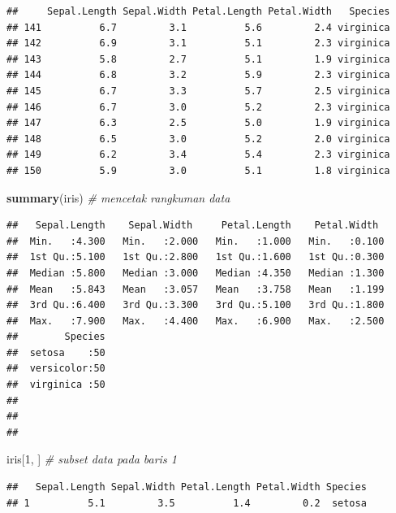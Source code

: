 \documentclass[]{article}
\newenvironment{Shaded}{\begin{snugshade}}{\end{snugshade}}
\newcommand{\KeywordTok}[1]{\textcolor[rgb]{0.13,0.29,0.53}{\textbf{#1}}}
\newcommand{\DecValTok}[1]{\textcolor[rgb]{0.00,0.00,0.81}{#1}}
\newcommand{\CommentTok}[1]{\textcolor[rgb]{0.56,0.35,0.01}{\textit{#1}}}
\newcommand{\NormalTok}[1]{#1}
\begin{document}
\begin{verbatim}
##     Sepal.Length Sepal.Width Petal.Length Petal.Width   Species
## 141          6.7         3.1          5.6         2.4 virginica
## 142          6.9         3.1          5.1         2.3 virginica
## 143          5.8         2.7          5.1         1.9 virginica
## 144          6.8         3.2          5.9         2.3 virginica
## 145          6.7         3.3          5.7         2.5 virginica
## 146          6.7         3.0          5.2         2.3 virginica
## 147          6.3         2.5          5.0         1.9 virginica
## 148          6.5         3.0          5.2         2.0 virginica
## 149          6.2         3.4          5.4         2.3 virginica
## 150          5.9         3.0          5.1         1.8 virginica
\end{verbatim}

\begin{Shaded}
\begin{Highlighting}[]
\KeywordTok{summary}\NormalTok{(iris) }\CommentTok{# mencetak rangkuman data}
\end{Highlighting}
\end{Shaded}

\begin{verbatim}
##   Sepal.Length    Sepal.Width     Petal.Length    Petal.Width   
##  Min.   :4.300   Min.   :2.000   Min.   :1.000   Min.   :0.100  
##  1st Qu.:5.100   1st Qu.:2.800   1st Qu.:1.600   1st Qu.:0.300  
##  Median :5.800   Median :3.000   Median :4.350   Median :1.300  
##  Mean   :5.843   Mean   :3.057   Mean   :3.758   Mean   :1.199  
##  3rd Qu.:6.400   3rd Qu.:3.300   3rd Qu.:5.100   3rd Qu.:1.800  
##  Max.   :7.900   Max.   :4.400   Max.   :6.900   Max.   :2.500  
##        Species  
##  setosa    :50  
##  versicolor:50  
##  virginica :50  
##                 
##                 
## 
\end{verbatim}

\begin{Shaded}
\begin{Highlighting}[]
\NormalTok{iris[}\DecValTok{1}\NormalTok{, ] }\CommentTok{# subset data pada baris 1}
\end{Highlighting}
\end{Shaded}

\begin{verbatim}
##   Sepal.Length Sepal.Width Petal.Length Petal.Width Species
## 1          5.1         3.5          1.4         0.2  setosa
\end{verbatim}
\end{document}
